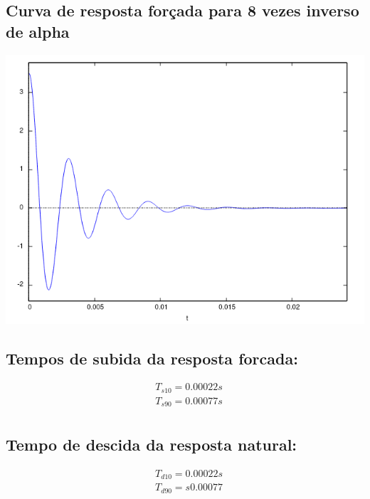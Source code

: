 \documentclass[12pt,twoside, a4paper, twocolumn]{article}
\begin{document}
\subsection{Curva de resposta forçada para 8 vezes inverso de alpha}

\begin{adjustbox}{scale=0.55}
    \includegraphics{Figure_4.png}
\end{adjustbox}

\subsection{Tempos de subida da resposta forcada:}

\begin{equation*}
    \begin{aligned}
         & T_{s10} = 0.00022s \\
         & T_{s90} = 0.00077s \\
    \end{aligned}
\end{equation*}

\subsection{Tempo de descida da resposta natural:}

\begin{equation*}
    \begin{aligned}
         & T_{d10} =  0.00022s  \\
         & T_{d90} = s  0.00077 \\
    \end{aligned}
\end{equation*}
\end{document}

